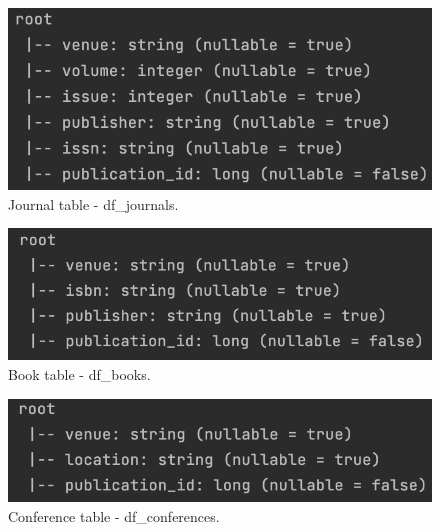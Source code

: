 \begin{figure}[H]
    \begin{center}
        \includegraphics[width=0.6\linewidth]{ImagesSpark/journal_schema}
        \caption{Journal table - df\_journals.}
        \label{fig:figure4_4}%
    \end{center}
\end{figure}
\begin{figure}[H]
    \begin{center}
        \includegraphics[width=0.6\linewidth]{ImagesSpark/book_schema}
        \caption{Book table - df\_books.}
        \label{fig:figure4_5}%
    \end{center}
\end{figure}
\begin{figure}[H]
    \begin{center}
        \includegraphics[width=0.6\linewidth]{ImagesSpark/conference_schema}
        \caption{Conference table - df\_conferences.}
        \label{fig:figure4_6}%
    \end{center}
\end{figure}


